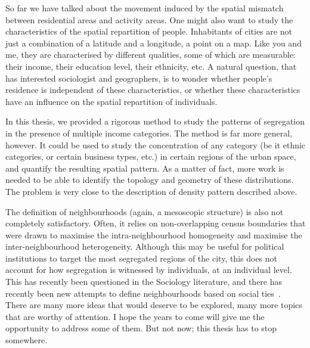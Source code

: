 So far we have talked about the movement induced by the spatial mismatch between
residential areas and activity areas. One might also want to study the
characteristics of the spatial repartition of people. Inhabitants of cities are
not just a combination of a latitude and a longitude, a point on a map. Like you
and me, they are characterised by different qualities, some of which are
measurable: their income, their education level, their ethnicity, etc. A
natural question, that has interested sociologist and geographers, is to wonder
whether people's residence is independent of these characteristics, or whether
these characteristics have an influence on the spatial repartition of
individuals.  

In this thesis, we provided a rigorous method to study the patterns of
segregation in the presence of multiple income categories. The method is far
more general, however. It could be used to study the concentration of any
category (be it ethnic categories, or certain business types, etc.)
in certain regions of the urban space, and quantify the resulting spatial pattern. As a
matter of fact, more work is needed to be able to identify the topology and
geometry of these distributions. The problem is very close to the description of
density pattern described above.

The definition of neighbourhoods (again, a mesoscopic structure) is also not
completely satisfactory. Often, it relies on non-overlapping census boundaries
that were drawn to maximise the intra-neighbourhood homogeneity and maximise the
inter-neighbourhood heterogeneity. Although this may be useful for political
institutions to target the most segregated regions of the city, this does not
account for how segregation is witnessed by individuals, at an individual level.
This has recently been questioned in the Sociology literature, and there has
recently been new attempts to define neighbourhoods based on social ties~\cite{Hipp:2012}.\\

There are many more ideas that would deserve to be explored, many more topics
that are worthy of attention. I hope the years to come will give me the opportunity
to address some of them. But not now; this thesis has to stop somewhere.  
